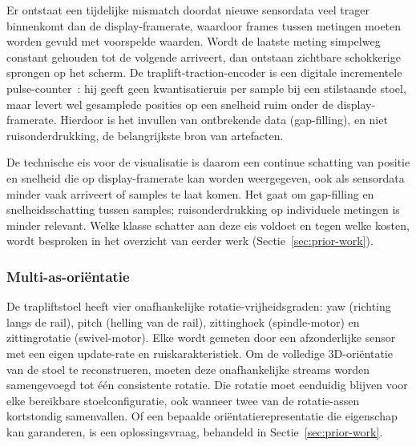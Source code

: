 \documentclass[10pt, a4paper, twocolumn]{article}
\begin{document}
Er ontstaat een tijdelijke mismatch doordat nieuwe sensordata 
veel trager binnenkomt dan de display-framerate, waardoor frames tussen 
metingen moeten worden gevuld met voorspelde waarden. Wordt de laatste meting 
simpelweg constant gehouden tot de volgende arriveert, dan ontstaan zichtbare 
schokkerige sprongen op het scherm. De traplift-traction-encoder is een digitale 
incrementele pulse-counter~\cite{merry2010encoder}: hij geeft geen kwantisatieruis 
per sample bij een stilstaande stoel, maar levert wel gesamplede posities op een 
snelheid ruim onder de display-framerate. Hierdoor is het invullen van ontbrekende 
data (gap-filling), en niet ruisonderdrukking, de belangrijkste bron van artefacten.

De technische eis voor de visualisatie is daarom een continue schatting van
positie en snelheid die op display-framerate kan worden weergegeven, ook als
sensordata minder vaak arriveert of samples te laat komen. Het gaat om
gap-filling en snelheidsschatting tussen samples; ruisonderdrukking op
individuele metingen is minder relevant. Welke klasse schatter aan deze eis
voldoet en tegen welke kosten, wordt besproken in het overzicht van eerder werk
(Sectie~\ref{sec:prior-work}).

\subsubsection{Multi-as-oriëntatie}
De trapliftstoel heeft vier onafhankelijke rotatie-vrijheidsgraden: yaw
(richting langs de rail), pitch (helling van de rail), zittinghoek
(spindle-motor) en zittingrotatie (swivel-motor). Elke wordt gemeten door een
afzonderlijke sensor met een eigen update-rate en ruiskarakteristiek. Om de volledige
3D-oriëntatie van de stoel te reconstrueren, moeten deze onafhankelijke streams
worden samengevoegd tot één consistente rotatie. Die rotatie moet eenduidig
blijven voor elke bereikbare stoelconfiguratie, ook wanneer twee van de
rotatie-assen kortstondig samenvallen. Of een bepaalde oriëntatierepresentatie
die eigenschap kan garanderen, is een oplossingsvraag, behandeld in
Sectie~\ref{sec:prior-work}.
\end{document}
